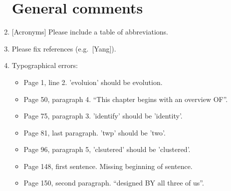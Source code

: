 \begin{enumerate}
\section{General comments}

\item{[Acronyms] Please include a table of abbreviations.

}

\item{Please fix references (e.g.\ [Yang]).}

\item{Typographical errors:
  \begin{itemize}
  \item{Page 1, line 2. 'evoluion' should be evolution.}
  \item{Page 50, paragraph 4. “This chapter begins with an overview
    OF”.}
  \item{Page 75, paragraph 3. 'identify' should be 'identity'.}
  \item{Page 81, last paragraph. 'twp' should be 'two'.}
  \item{Page 96, paragraph 5, 'clsutered' should be 'clustered'.}
  \item{Page 148, first sentence. Missing beginning of sentence.}
  \item{Page 150, second paragraph. “designed BY all three of us”.}
  \end{itemize}
}
\end{enumerate}
